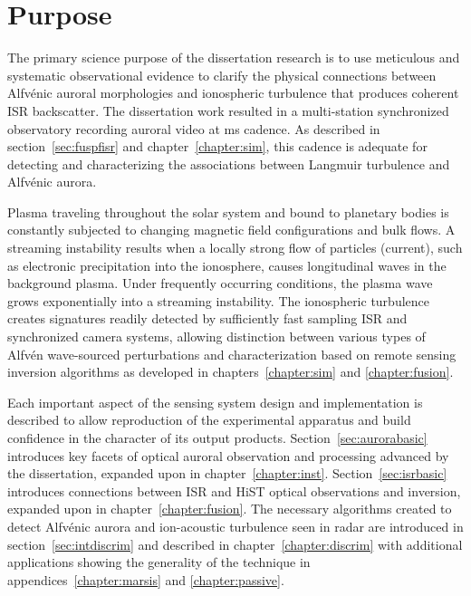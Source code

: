 \section{Purpose}
The primary science purpose of the dissertation research is to use meticulous and systematic observational evidence to clarify the physical connections between Alfvénic auroral morphologies and ionospheric turbulence that produces coherent ISR backscatter.
The dissertation work resulted in a multi-station synchronized observatory recording auroral video at \unit[20]{ms} cadence.
As described in section~\ref{sec:fuspfisr} and chapter~\ref{chapter:sim}, this cadence is adequate for detecting and characterizing the associations between Langmuir turbulence and Alfvénic aurora.

Plasma traveling throughout the solar system and bound to planetary bodies is constantly subjected to changing magnetic field configurations and bulk flows.
A streaming instability results when a locally strong flow of particles (current), such as electronic precipitation into the ionosphere, causes longitudinal waves in the background plasma. 
Under frequently occurring conditions, the plasma wave grows exponentially into a streaming instability.
The ionospheric turbulence creates signatures readily detected by sufficiently fast sampling ISR and synchronized camera systems, allowing distinction between various types of Alfvén wave-sourced perturbations and characterization based on remote sensing inversion algorithms as developed in chapters~\ref{chapter:sim} and \ref{chapter:fusion}.

Each important aspect of the sensing system design and implementation is described to allow reproduction of the experimental apparatus and build confidence in the character of its output products.
Section~\ref{sec:aurorabasic} introduces key facets of optical auroral observation and processing advanced by the dissertation, expanded upon in chapter~\ref{chapter:inst}.
Section~\ref{sec:isrbasic} introduces connections between ISR and HiST optical observations and inversion, expanded upon in chapter~\ref{chapter:fusion}.
The necessary algorithms created to detect Alfvénic aurora and ion-acoustic turbulence seen in radar are introduced in section~\ref{sec:intdiscrim} and described in chapter~\ref{chapter:discrim} with additional applications showing the generality of the technique in appendices~\ref{chapter:marsis} and \ref{chapter:passive}.






